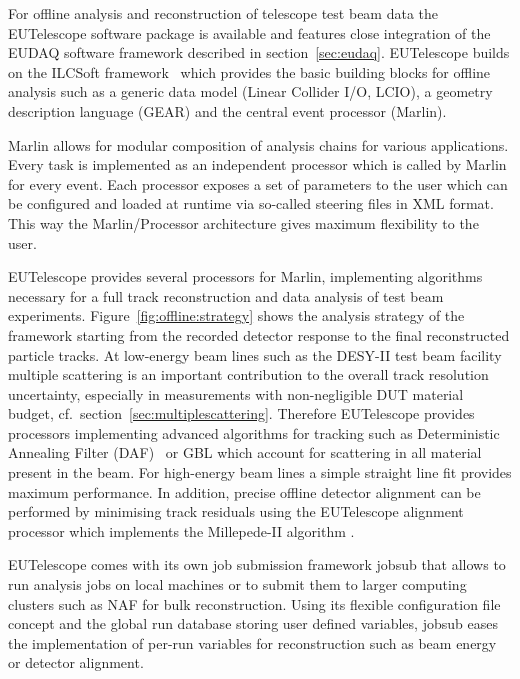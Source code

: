 

For offline analysis and reconstruction of telescope test beam data the EUTelescope software package \cite{ref:eutelwebsite} is available and features close integration of the EUDAQ software framework described in section~\ref{sec:eudaq}.
EUTelescope builds on the ILCSoft framework~\cite{ref:eudetmemo_2009_12} which provides the basic building blocks for offline analysis such as a generic data model (Linear Collider I/O, LCIO),
a geometry description language (GEAR) and the central event processor (Marlin).

Marlin allows for modular composition of analysis chains for various applications. Every task is implemented as an independent processor which is called by Marlin for every event. 
Each processor exposes a set of parameters to the user which can be configured and loaded at runtime via so-called steering files in XML format.
This way the Marlin/Processor architecture gives maximum flexibility to the user.

EUTelescope provides several processors for Marlin, implementing algorithms necessary for a full track reconstruction and data analysis of test beam experiments. 
Figure~\ref{fig:offline:strategy} shows the analysis strategy of the framework starting from the recorded detector response to the final reconstructed particle tracks. 
At low-energy beam lines such as the DESY-II test beam facility multiple scattering is an important contribution to the overall track resolution uncertainty, especially in measurements with non-negligible DUT material budget, cf.\ section~\ref{sec:multiplescattering}.
Therefore EUTelescope provides processors implementing advanced algorithms for tracking such as Deterministic Annealing Filter (DAF)~\cite{ref:daffitter} or GBL which account for scattering in all material present in the beam.
For high-energy beam lines a simple straight line fit provides maximum performance.
In addition, precise offline detector alignment can be performed by minimising track residuals using the EUTelescope alignment processor which implements the Millepede-II algorithm \cite{Blobel-2006}.

EUTelescope comes with its own job submission framework jobsub that allows to run analysis jobs on local machines or to submit them to larger computing clusters such as NAF for bulk reconstruction.
Using its flexible configuration file concept and the global run database storing user defined variables, jobsub eases the implementation of per-run variables for reconstruction such as beam energy or detector alignment.

